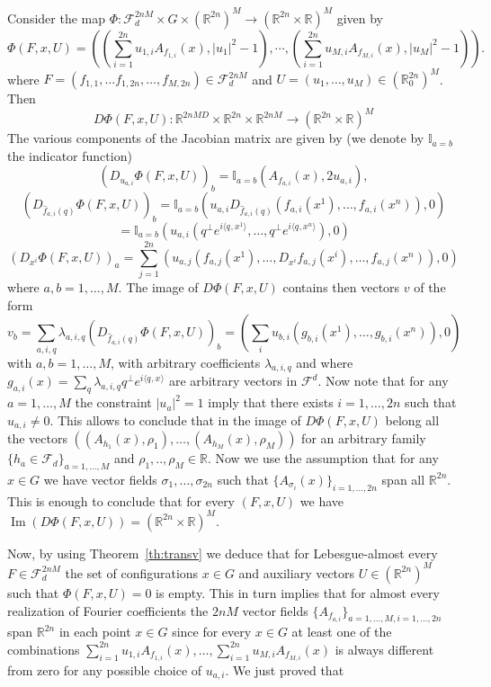 \documentclass[11pt,a4paper]{article}%
\begin{document}
Consider the map $\Phi: \mathcal{F}_{d}^{2 n M} \times G \times
(\mathbb{R}^{2n})^{M} \rightarrow(\mathbb{R}^{2 n}\times \mathbb{R})^{M}$ given by
\[
\Phi(F, x,U)  = ( (\sum_{i = 1}^{2 n} u_{1, i} A_{f_{1, i}} (x),|u_1|^2-1), \cdots, (\sum_{i =
1}^{2 n} u_{M, i} A_{f_{M, i}} (x),|u_M|^2-1)) .
\]
where $F = (f_{1, 1}, \ldots f_{1, 2 n}, \ldots, f_{M, 2 n}) \in\mathcal{F}%
_{d}^{2 n M}$ and $U = (u_{1}, \ldots, u_{M}) \in(
{\mathbb{R}^{2n}_0})^{M}$. Then
\[
D \Phi(F, x, U) : \mathbb{R}^{2 nMD} \times\mathbb{R}^{2 n} \times
\mathbb{R}^{2 n M} \rightarrow(\mathbb{R}^{2 n}\times\mathbb{R})^{M}
\]
The various components
of the Jacobian matrix   are given by (we denote by $\mathbb{I}_{a =
b}$
the indicator
function)
\[
(D_{u_{a, i}} \Phi(F, x, U))_{b} =\mathbb{I}_{a = b} (A_{f_{a, i}}
(x),2 u_{a,i}),
\]
\[
(D_{\hat{f}_{a, i} (q)} \Phi(F, x, U))_{b} =\mathbb{I}_{a = b} (u_{a, i}
D_{\hat{f}_{a, i} (q)} (f_{a, i} (x^{1}), \ldots, f_{a, i} (x^{n})),0)
\]
\[
=\mathbb{I}_{a = b} (u_{a, i} (q^{\bot} e^{i \langle q_{}, x^{1} \rangle}, \ldots,
q^{\bot} e^{i \langle q_{}, x^{n} \rangle}),0)
\]
\[
(D_{x^{i}} \Phi(F, x, U))_{a} =  \sum_{j = 1}^{2 n} (u_{a,
j}  (f_{a, j} (x^{1}), \ldots, D_{x^{i}} f_{a, j} (x^{i}), \ldots, f_{a, j}
(x^{n})),0)
\]
where $a, b = 1, \ldots, M$. The image of $D \Phi(F, x, U)$ contains then
vectors $v$ of the form
\[
v_{b} = \sum_{ a,i,q} \lambda_{a,i, q} (D_{\hat{f}_{a, i} (q)} \Phi(F, x, U))_{b}
=(\sum_{i} u_{b, i} (g_{b, i} (x^{1}), \ldots, g_{b, i} (x^{n})),0)
\]
with $a, b = 1, \ldots, M$, with arbitrary coefficients $\lambda_{a,
i, q}$ and where $g_{a, i} (x) = \sum_{q} \lambda_{a, i, q} q^{\bot}
e^{i \langle q_{}, x^{} \rangle} $ are  arbitrary vectors in
$\mathcal{F}^{d}$. Now note that for any $a = 1, \ldots, M$ the constraint $|u_{a}|^2=1$
imply that there exists $i = 1, \ldots, 2 n$ such that $u_{a, i}
\neq0$. This allows to conclude that in the image of $D \Phi(F, x,
U)$ belong all the vectors  $((A_{h_{1}} (x),\rho_1), \ldots,
(A_{h_{M}} (x),\rho_M))$ for an arbitrary family $\{h_{a}
\in\mathcal{F}_{d}\}_{a = 1, \ldots, M}$ and $\rho_1,..,\rho_M\in\mathbb{R}$. Now we use the assumption
that for any $x \in G$ we have vector fields $\sigma_{1}, \ldots,
\sigma_{2 n}$ such that $\{A_{\sigma_{i}} (x)\}_{i = 1, \ldots, 2
n}$ span all $\mathbb{R}^{2 n}$. This is enough to conclude that for
every $(F, x, U)$ we have $\operatorname{Im}  (D \Phi(F, x, U)) =
(\mathbb{R}^{2 n}\times\mathbb{R})^{M}$.

\medskip Now, by using Theorem~\ref{th:transv} we deduce that for
Lebesgue-almost every $F\in \mathcal{F}_{d}^{2 n M}$ the set of
configurations $x \in G$ and auxiliary vectors $U
\in({\mathbb{R}^{2n}})^{M}$ such that $\Phi(F, x, U) = 0$ is
empty. This in turn implies that for almost every realization of
Fourier coefficients the $2 n M$ vector fields $\{A_{f_{a, i}} \}_{a
= 1, \ldots, M, i = 1, \ldots, 2 n}$ span $\mathbb{R}^{2 n}$ in each
point $x \in G$ since for every $x\in G$ at least one of the
combinations
$
\sum_{i = 1}^{2 n} u_{1, i} A_{f_{1, i}} (x), \ldots, \sum_{i = 1}^{2 n}
u_{M, i} A_{f_{M, i}} (x)
$
is always different from zero for any possible choice of $u_{a, i}$. We just
proved that
\end{document}
